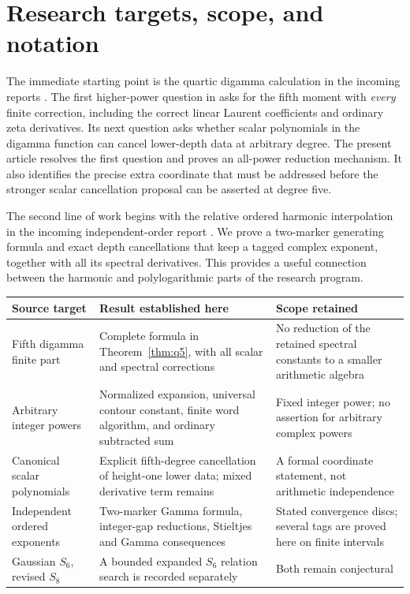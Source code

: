 \documentclass[11pt,a4paper]{article}
\numberwithin{equation}{section}
\theoremstyle{definition}
\theoremstyle{remark}
\begin{document}
\hypersetup{pageanchor=true}
\tableofcontents
\newpage
{}

\section{Research targets, scope, and notation}
\label{sec:scope}

The immediate starting point is the quartic digamma calculation in the
incoming reports \cite{Quartic,Barnes}.  The first higher-power question
in \cite{Quartic} asks for the fifth moment with \emph{every} finite
correction, including the correct linear Laurent coefficients and
ordinary zeta derivatives.  Its next question asks whether scalar
polynomials in the digamma function can cancel lower-depth data at
arbitrary degree.  The present article resolves the first question and
proves an all-power reduction mechanism.  It also identifies the precise
extra coordinate that must be addressed before the stronger scalar
cancellation proposal can be asserted at degree five.

The second line of work begins with the relative ordered harmonic
interpolation in the incoming independent-order report \cite{Independent}.
We prove a two-marker generating formula and exact depth cancellations
that keep a tagged complex exponent, together with all its spectral
derivatives.  This provides a useful connection between the harmonic
and polylogarithmic parts of the research program.

\begin{center}
\small
\begin{tabular}{>{\raggedright\arraybackslash}p{}
>{\raggedright\arraybackslash}p{}
>{\raggedright\arraybackslash}p{}}
\toprule
Source target & Result established here & Scope retained\\
\midrule
Fifth digamma finite part & Complete formula in Theorem~\ref{thm:q5},
with all scalar and spectral corrections & No reduction of the retained
spectral constants to a smaller arithmetic algebra\\[3pt]
Arbitrary integer powers & Normalized expansion, universal contour
constant, finite word algorithm, and ordinary subtracted sum & Fixed
integer power; no assertion for arbitrary complex powers\\[3pt]
Canonical scalar polynomials & Explicit fifth-degree cancellation of
height-one lower data; mixed derivative term remains & A formal
coordinate statement, not arithmetic independence\\[3pt]
Independent ordered exponents & Two-marker Gamma formula, integer-gap
reductions, Stieltjes and Gamma consequences & Stated convergence discs;
several tags are proved here on finite intervals\\[3pt]
Gaussian $S_6$, revised $S_8$ & A bounded expanded $S_6$ relation search
is recorded separately & Both remain conjectural\\
\bottomrule
\end{tabular}
\end{center}
\end{document}
